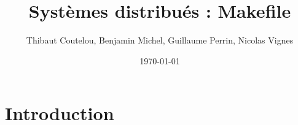 \documentclass[a4paper,11pt]{article}
\title{Systèmes distribués : Makefile}
\author{Thibaut Coutelou, Benjamin Michel, Guillaume Perrin, Nicolas Vignes}
\date{\today}
\begin{document}
\maketitle

\setlength{\parskip}{2mm}

\section{Introduction}
\end{document}
